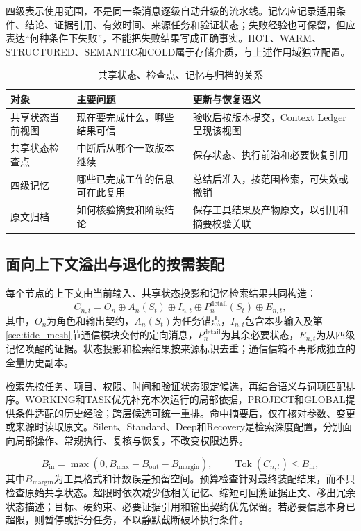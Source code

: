 四级表示使用范围，不是同一条消息逐级自动升级的流水线。记忆应记录适用条件、结论、证据引用、有效时间、来源任务和验证状态；失败经验也可保留，但应表达“何种条件下失败”，不能把失败结果写成正确事实。HOT、WARM、STRUCTURED、SEMANTIC和COLD属于存储介质，与上述作用域独立配置。

\begin{table}[htbp]
\centering
\caption{共享状态、检查点、记忆与归档的关系}
\label{tab:anchor_state_objects}
\begin{tabular}{p{}p{}p{}}
\toprule
对象 & 主要问题 & 更新与恢复语义 \\
\midrule
共享状态当前视图 & 现在要完成什么，哪些结果可信 & 验收后按版本提交，Context Ledger呈现该视图 \\
共享状态检查点 & 中断后从哪个一致版本继续 & 保存状态、执行前沿和必要恢复引用 \\
四级记忆 & 哪些已完成工作的信息可在此复用 & 总结后准入，按范围检索，可失效或撤销 \\
原文归档 & 如何核验摘要和阶段结论 & 保存工具结果及产物原文，以引用和摘要校验关联 \\
\bottomrule
\end{tabular}
\end{table}

\subsection{面向上下文溢出与退化的按需装配}

每个节点的上下文由当前输入、共享状态投影和记忆检索结果共同构造：
\begin{equation}
C_{n,t}=O_n\oplus A_n(S_t)\oplus I_{n,t}
\oplus P_n^{\mathrm{detail}}(S_t)\oplus E_{n,t},
\label{eq:anchor_context}
\end{equation}
其中，$O_n$为角色和输出契约，$A_n(S_t)$为任务锚点，$I_{n,t}$包含本步输入及第\ref{sec:tide_mesh}节通信模块交付的定向消息，$P_n^{\mathrm{detail}}$为其余必要状态，$E_{n,t}$为从四级记忆唤醒的证据。状态投影和检索结果按来源标识去重；通信信箱不再形成独立的全量历史副本。

检索先按任务、项目、权限、时间和验证状态限定候选，再结合语义与词项匹配排序。WORKING和TASK优先补充本次运行的局部依据，PROJECT和GLOBAL提供条件适配的历史经验；跨层候选可统一重排。命中摘要后，仅在核对参数、变更或来源时读取原文。Silent、Standard、Deep和Recovery是检索深度配置，分别面向局部操作、常规执行、复核与恢复，不改变权限边界。

\begin{equation}
B_{\mathrm{in}}=\max(0,B_{\mathrm{max}}-B_{\mathrm{out}}-B_{\mathrm{margin}}),
\qquad \operatorname{Tok}(C_{n,t})\leq B_{\mathrm{in}},
\label{eq:anchor_budget}
\end{equation}
其中$B_{\mathrm{margin}}$为工具格式和计数误差预留空间。预算检查针对最终装配结果，而不只检查原始共享状态。超限时依次减少低相关记忆、缩短可回溯证据正文、移出冗余状态描述；目标、硬约束、必要证据引用和输出契约优先保留。若必要信息本身已超限，则暂停或拆分任务，不以静默截断破坏执行条件。

